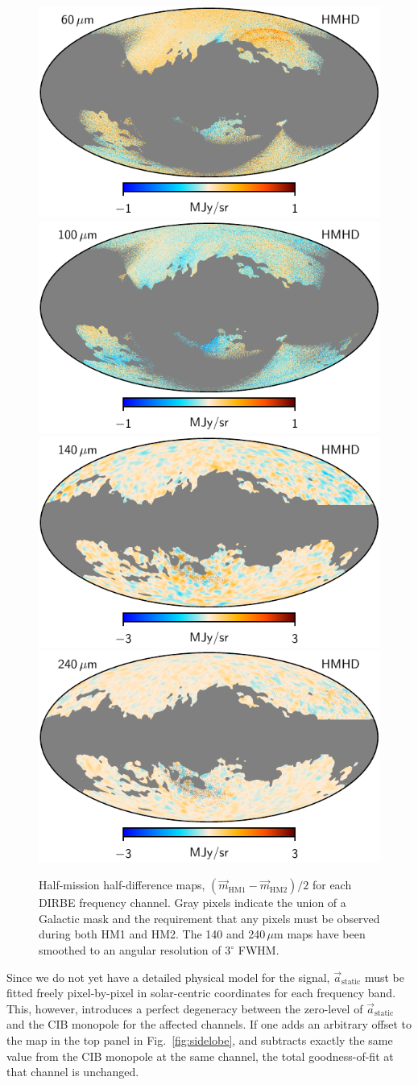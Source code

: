 \documentclass{aa}
\renewcommand{\a}[0]{\vec{a}}
\newcommand{\m}[0]{\vec{m}}
\begin{document}
\begin{figure}
  \includegraphics[width=0.42\linewidth]{figs/dirbe_07_hmhd_v1.pdf}\hspace*{5mm}
  \includegraphics[width=0.42\linewidth]{figs/dirbe_08_hmhd_v1.pdf}\\
  \includegraphics[width=0.42\linewidth]{figs/dirbe_09_hmhd_v1_3deg.pdf}\hspace*{5mm}
  \includegraphics[width=0.42\linewidth]{figs/dirbe_10_hmhd_v1_3deg.pdf}
  \caption{Half-mission half-difference maps, $(\m_{\mathrm{HM1}}-\m_{\mathrm{HM2}})/2$ for each DIRBE frequency channel. Gray pixels indicate the union of a Galactic mask and the requirement that any pixels must be observed during both HM1 and HM2. The 140 and 240\,$\mu\mathrm{m}$ maps have been smoothed to an angular resolution of $3^{\circ}$ FWHM.}
  \label{fig:hmhd}
\end{figure}



Since we do not yet have a detailed physical model for the signal,
$\a_{\mathrm{static}}$ must be fitted freely pixel-by-pixel in
solar-centric coordinates for each frequency band. This, however,
introduces a perfect degeneracy between the zero-level of
$\a_{\mathrm{static}}$ and the CIB monopole for the affected channels.
If one adds an arbitrary offset to the map in the top panel in
Fig.~\ref{fig:sidelobe}, and subtracts exactly the same value from the
CIB monopole at the same channel, the total goodness-of-fit at that
channel is unchanged.
\end{document}
